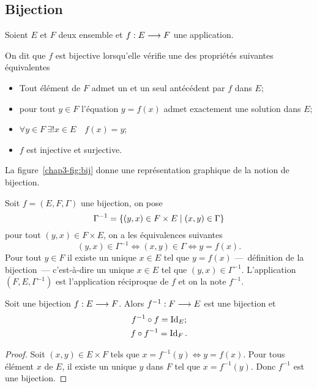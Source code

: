 \subsection{Bijection}
\label{chap3-subsubsec:bijection}

Soient \(E\) et \(F\) deux ensemble et \(f:E \longrightarrow F\) une application.
\begin{defdef}
    On dit que \(f\) est bijective lorsqu'elle vérifie une des propriétés 
    suivantes équivalentes
    \begin{itemize}
        \item Tout élément de \(F\) admet un et un seul antécédent par \(f\) 
            dans \(E\);
        \item pour tout \(y \in F\) l'équation \(y = f(x)\) admet exactement une 
            solution dans \(E\);
        \item \(\forall y \in F \ \exists! x \in E \quad f(x) = y\);
        \item \(f\) est injective et surjective.
    \end{itemize}
    La figure~\ref{chap3-fig:bij} donne une représentation graphique de la 
    notion de bijection.
\end{defdef}

Soit \(f = (E, F, \Gamma)\) une bijection, on pose 
\begin{equation}
    \Gamma^{-1} = \left\{(y,x) \in F \times E\mathrel{}\middle|\mathrel{}(x,y) \in \Gamma\right\}
\end{equation}
pour tout \((y,x) \in F \times E\), on a les équivalences suivantes
\begin{equation}
    (y, x) \in \Gamma^{-1} \iff (x, y) \in \Gamma \iff y = f(x).
\end{equation}
Pour tout \(y \in F\) il existe un unique \(x \in E\) tel que \(y = f(x)\) 
---~définition de la bijection~--- c'est-à-dire un unique \(x \in E\) tel que 
\((y,x) \in \Gamma^{-1}\). L'application \((F,E,\Gamma^{-1})\) est l'application 
réciproque de \(f\) et on la note \(f^{-1}\).

\begin{prop} Soit une bijection \(f:E \longrightarrow F\). Alors 
    \(f^{-1}:F \longrightarrow E\) est une bijection et
    \begin{gather}
        f^{-1} \circ f  = \operatorname{Id}_E; \\
        f \circ f^{-1} = \operatorname{Id}_F.
    \end{gather}
\end{prop}

\begin{proof}
    Soit \((x, y) \in E \times F\) tels que \(x = f^{-1}(y) \iff y = f(x)\). Pour 
    tous élément \(x\) de \(E\), il existe un unique \(y\) dans \(F\) tel que 
    \(x = f^{-1}(y)\). Donc \(f^{-1}\) est une bijection.
\end{proof}

